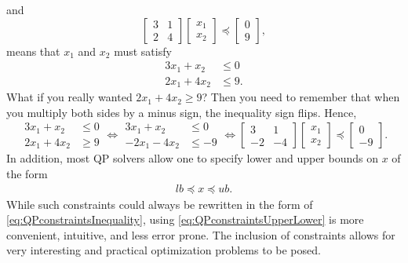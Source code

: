 and 
$$\begin{bmatrix}3 & 1 \\ 2 & 4\end{bmatrix}\begin{bmatrix}x_1 \\ x_2 \end{bmatrix} \preceq \begin{bmatrix}0 \\ 9\end{bmatrix},  $$
means that $x_1$ and $x_2$ must satisfy
$$\begin{aligned} 3 x_1 + x_2 &\le 0  \\ 2 x_1 + 4 x_2 &\le 9. \end{aligned} $$
What if you really wanted $2 x_1 + 4 x_2 \ge 9$? Then you need to remember that when you multiply both sides by a minus sign, the inequality sign flips. Hence,
$$\begin{aligned} 3 x_1 + x_2 &\le 0  \\ 2 x_1 + 4 x_2 &\ge 9 \end{aligned} \iff \begin{aligned} 3 x_1 + x_2 &\le 0  \\ -2 x_1 - 4 x_2 &\le -9 \end{aligned} \iff  \left[
\begin{array}{rr}
3 & 1\\ -2 & -4
\end{array} \right] \begin{bmatrix}x_1 \\ x_2 \end{bmatrix} \preceq \left[
\begin{array}{r}
0 \\ -9
\end{array}
\right].$$
In addition, most QP solvers allow one to specify lower and upper bounds on $x$ of the form
\begin{align}
\label{eq:QPconstraintsUpperLower}
   lb \preceq x \preceq ub.
\end{align}
While such constraints could always be rewritten in the form of \eqref{eq:QPconstraintsInequality}, using \eqref{eq:QPconstraintsUpperLower} is more convenient, intuitive, and less error prone. The inclusion of constraints allows for very interesting and practical optimization problems to be posed. 

\vspace*{0.5cm}

